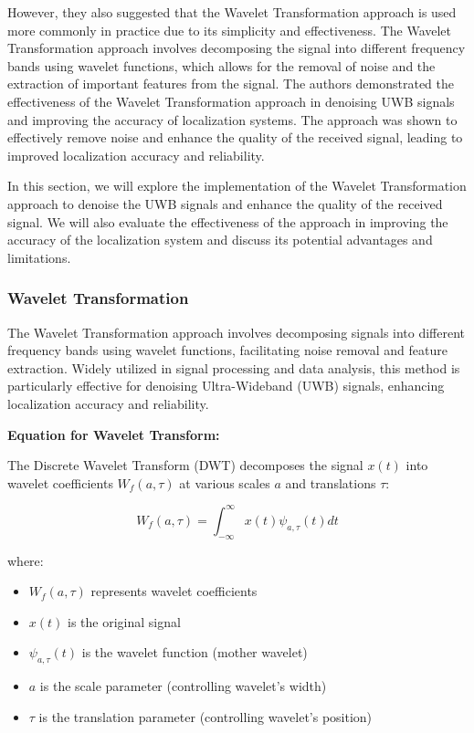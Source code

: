 However, they also suggested that the Wavelet Transformation approach is used more commonly in practice due to its simplicity and effectiveness. The Wavelet Transformation approach involves decomposing the signal into different frequency bands using wavelet functions, which allows for the removal of noise and the extraction of important features from the signal. The authors demonstrated the effectiveness of the Wavelet Transformation approach in denoising UWB signals and improving the accuracy of localization systems. The approach was shown to effectively remove noise and enhance the quality of the received signal, leading to improved localization accuracy and reliability.

In this section, we will explore the implementation of the Wavelet Transformation approach to denoise the UWB signals and enhance the quality of the received signal. We will also evaluate the effectiveness of the approach in improving the accuracy of the localization system and discuss its potential advantages and limitations.

\subsubsection{Wavelet Transformation}\label{wavelet_transformation}

The Wavelet Transformation approach involves decomposing signals into different frequency bands using wavelet functions, facilitating noise removal and feature extraction. Widely utilized in signal processing and data analysis, this method is particularly effective for denoising Ultra-Wideband (UWB) signals, enhancing localization accuracy and reliability.

\textbf{Equation for Wavelet Transform:}

The Discrete Wavelet Transform (DWT) decomposes the signal $x(t)$ into wavelet coefficients $W_f(a, \tau)$ at various scales $a$ and translations $\tau$:

\begin{equation}
W_f(a, \tau) = \int_{-\infty}^{\infty} x(t) \psi_{a, \tau}(t) dt
\end{equation}

where:

\begin{itemize}
  \item $W_f(a, \tau)$ represents wavelet coefficients
  \item $x(t)$ is the original signal
  \item $\psi_{a, \tau}(t)$ is the wavelet function (mother wavelet)
  \item $a$ is the scale parameter (controlling wavelet's width)
  \item $\tau$ is the translation parameter (controlling wavelet's position)
\end{itemize}

